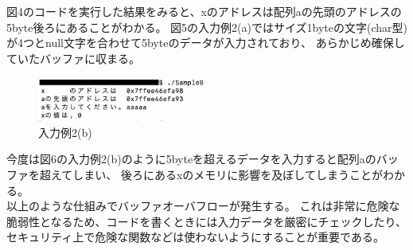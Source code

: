 \documentclass[12pt]{jarticle}
\begin{document}
図4のコードを実行した結果をみると、xのアドレスは配列aの先頭のアドレスの5byte後ろにあることがわかる。
図5の入力例2(a)ではサイズ1byteの文字(char型)が4つとnull文字を合わせて5byteのデータが入力されており、
あらかじめ確保していたバッファに収まる。\\

\begin{figure}[h]
    \begin{center}
        \includegraphics[width=8cm]{B_5.png}
        \caption{入力例2(b)}
        \label{ラベル}
    \end{center}
\end{figure}

今度は図6の入力例2(b)のように5byteを超えるデータを入力すると配列aのバッファを超えてしまい、
後ろにあるxのメモリに影響を及ぼしてしまうことがわかる。\\

以上のような仕組みでバッファオーバフローが発生する。
これは非常に危険な脆弱性となるため、コードを書くときには入力データを厳密にチェックしたり、
セキュリティ上で危険な関数などは使わないようにすることが重要である。
\end{document}
